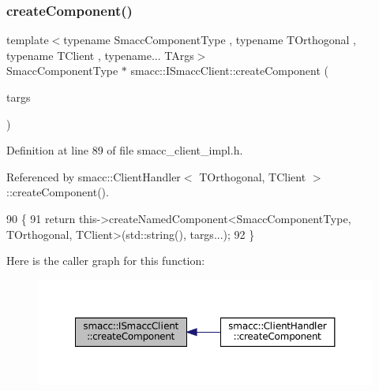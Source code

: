 \subsubsection{\texorpdfstring{create\+Component()}{createComponent()}}
{\footnotesize\ttfamily template$<$typename Smacc\+Component\+Type , typename T\+Orthogonal , typename T\+Client , typename... T\+Args$>$ \\
Smacc\+Component\+Type $\ast$ smacc\+::\+I\+Smacc\+Client\+::create\+Component (\begin{DoxyParamCaption}\item[{T\+Args...}]{targs }\end{DoxyParamCaption})\hspace{0.3cm}{\ttfamily [protected]}}



Definition at line 89 of file smacc\+\_\+client\+\_\+impl.\+h.



Referenced by smacc\+::\+Client\+Handler$<$ T\+Orthogonal, T\+Client $>$\+::create\+Component().


\begin{DoxyCode}
90 \{
91     \textcolor{keywordflow}{return} this->createNamedComponent<SmaccComponentType, TOrthogonal, TClient>(std::string(), targs...);
92 \}
\end{DoxyCode}
Here is the caller graph for this function\+:
\nopagebreak
\begin{figure}[H]
\begin{center}
\leavevmode
\includegraphics[width=350pt]{classsmacc_1_1ISmaccClient_a5c1c8eb5e91a3b399662a52cb0ca86aa_icgraph}
\end{center}
\end{figure}
\mbox{\label{classsmacc_1_1ISmaccClient_affcc2f95bc993b5f07ef0d6ab6eec8f1}} 
